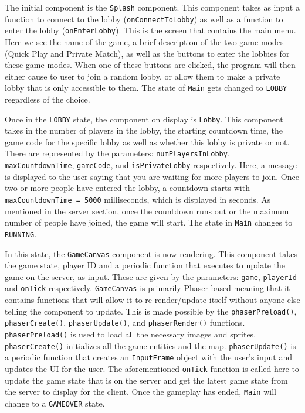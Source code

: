 \documentclass[12pt]{report}
\begin{document}
The initial component is the \texttt{Splash} component. This component takes as input a function to connect to the lobby (\texttt{onConnectToLobby}) as well as a function to enter the lobby (\texttt{onEnterLobby}). This is the screen that contains the main menu. Here we see the name of the game, a brief description of the two game modes (Quick Play and Private Match), as well as the buttons to enter the lobbies for these game modes. When one of these buttons are clicked, the program will then either cause to user to join a random lobby, or allow them to make a private lobby that is only accessible to them. The state of \texttt{Main} gets changed to \texttt{LOBBY} regardless of the choice.


Once in the \texttt{LOBBY} state, the component on display is \texttt{Lobby}. This component takes in the number of players in the lobby, the starting countdown time, the game code for the specific lobby as well as whether this lobby is private or not. There are represented by the parameters: \texttt{numPlayersInLobby}, \texttt{maxCountdownTime}, \texttt{gameCode}, and \texttt{isPrivateLobby} respectively. Here, a message is displayed to the user saying that you are waiting for more players to join. Once two or more people have entered the lobby, a countdown starts with \texttt{maxCountdownTime = 5000} milliseconds, which is displayed in seconds. As mentioned in the server section, once the countdown runs out or the maximum number of people have joined, the game will start. The state in \texttt{Main} changes to \texttt{RUNNING}.


In this state, the \texttt{GameCanvas} component is now rendering. This component takes the game state, player ID and a periodic function that executes to update the game on the server, as input. These are given by the parameters: \texttt{game}, \texttt{playerId} and \texttt{onTick} respectively. \texttt{GameCanvas} is primarily Phaser based meaning that it contains functions that will allow it to re-render/update itself without anyone else telling the component to update. This is made possible by the \texttt{phaserPreload()}, \texttt{phaserCreate()}, \texttt{phaserUpdate()}, and \texttt{phaserRender()} functions. \texttt{phaserPreload()} is used to load all the necessary images and sprites. \texttt{phaserCreate()} initializes all the game entities and the map. \texttt{phaserUpdate()} is a periodic function that creates an \texttt{InputFrame} object with the user's input and updates the UI for the user. The aforementioned \texttt{onTick} function is called here to update the game state that is on the server and get the latest game state from the server to display for the client. Once the gameplay has ended, \texttt{Main} will change to a \texttt{GAMEOVER} state.
\end{document}
